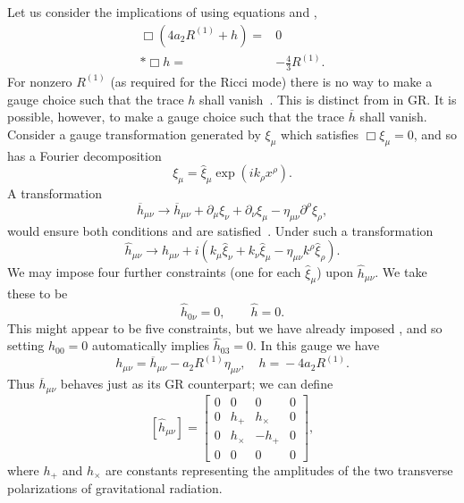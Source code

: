 Let us consider the implications of  using equations  and ,
\begin{align}
\Box\left(4a_2R^{(1)} + h\right) = {} & 0 \nonumber \\*
\Box h = {} & -\frac{4}{3}R^{(1)}.
\end{align}
For nonzero $R^{(1)}$ (as required for the Ricci mode) there is no way to make a gauge choice such that the trace $h$ shall vanish~\cite{Corda2008, Capozziello2008}. This is distinct from in GR. It is possible, however, to make a gauge choice such that the trace $\overline{h}$ shall vanish. Consider a gauge transformation generated by $\xi_\mu$ which satisfies $\Box \xi_\mu = 0$, and so has a Fourier decomposition
\begin{equation}
\xi_\mu = \widehat{\xi}_\mu \exp\left(ik_\rho x^\rho\right).
\end{equation}
A transformation
\begin{equation}
\overline{h}_{\mu\nu} \rightarrow \overline{h}_{\mu\nu} + \partial_\mu\xi_\nu + \partial_\nu\xi_\mu - \eta_{\mu\nu}\partial^\rho\xi_\rho,
\end{equation}
would ensure both conditions  and  are satisfied~\cite{Misner1973}. Under such a transformation
\begin{equation}
\widehat{h}_{\mu\nu} \rightarrow \widehat{h}_{\mu\nu} + i\left(k_\mu\widehat{\xi}_\nu + k_\nu\widehat{\xi}_\mu - \eta_{\mu\nu}k^\rho\widehat{\xi}_\rho\right).
\end{equation}
We may impose four further constraints (one for each $\widehat{\xi}_\mu$) upon $\widehat{h}_{\mu\nu}$. We take these to be
\begin{equation}
\widehat{h}_{0\nu} = 0, \qquad \widehat{h} = 0.
\end{equation}
This might appear to be five constraints, but we have already imposed , and so setting $\widehat{h}_{00} = 0$ automatically implies $\widehat{h}_{03} = 0$. In this gauge we have
\begin{equation}
h_{\mu\nu} = {} \overline{h}_{\mu\nu} - a_2 R^{(1)}\eta_{\mu\nu}, \quad h = {} -4a_2R^{(1)}.
\label{eq:gauge}
\end{equation}
Thus $\overline{h}_{\mu\nu}$ behaves just as its GR counterpart; we can define
\begin{equation}
\left[\widehat{h}_{\mu\nu}\right] =
\begin{bmatrix}
0 & 0 & 0 & 0\\
0 & h_+ & h_\times & 0\\
0 & h_\times & -h_+ & 0\\
0 & 0 & 0 & 0
\end{bmatrix},
\end{equation}
where $h_+$ and $h_\times$ are constants representing the amplitudes of the two transverse polarizations of gravitational radiation.

